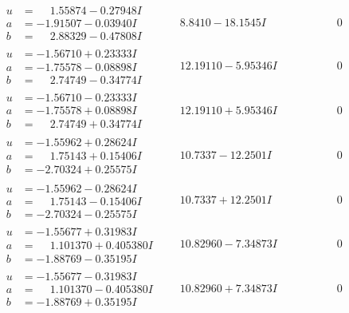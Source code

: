 \documentclass[1p]{elsarticle_modified}
\theoremstyle{definition}
\begin{document}
$$\begin{array}{c|c|c}
\begin{aligned}
u &= \phantom{-}1.55874 - 0.27948 I \\
a &= -1.91507 - 0.03940 I \\
b &= \phantom{-}2.88329 - 0.47808 I\end{aligned}
 & \phantom{-}8.8410 - 18.1545 I & \phantom{-0.000000 } 0 \\ \hline\begin{aligned}
u &= -1.56710 + 0.23333 I \\
a &= -1.75578 - 0.08898 I \\
b &= \phantom{-}2.74749 - 0.34774 I\end{aligned}
 & \phantom{-}12.19110 - 5.95346 I & \phantom{-0.000000 } 0 \\ \hline\begin{aligned}
u &= -1.56710 - 0.23333 I \\
a &= -1.75578 + 0.08898 I \\
b &= \phantom{-}2.74749 + 0.34774 I\end{aligned}
 & \phantom{-}12.19110 + 5.95346 I & \phantom{-0.000000 } 0 \\ \hline\begin{aligned}
u &= -1.55962 + 0.28624 I \\
a &= \phantom{-}1.75143 + 0.15406 I \\
b &= -2.70324 + 0.25575 I\end{aligned}
 & \phantom{-}10.7337 - 12.2501 I & \phantom{-0.000000 } 0 \\ \hline\begin{aligned}
u &= -1.55962 - 0.28624 I \\
a &= \phantom{-}1.75143 - 0.15406 I \\
b &= -2.70324 - 0.25575 I\end{aligned}
 & \phantom{-}10.7337 + 12.2501 I & \phantom{-0.000000 } 0 \\ \hline\begin{aligned}
u &= -1.55677 + 0.31983 I \\
a &= \phantom{-}1.101370 + 0.405380 I \\
b &= -1.88769 - 0.35195 I\end{aligned}
 & \phantom{-}10.82960 - 7.34873 I & \phantom{-0.000000 } 0 \\ \hline\begin{aligned}
u &= -1.55677 - 0.31983 I \\
a &= \phantom{-}1.101370 - 0.405380 I \\
b &= -1.88769 + 0.35195 I\end{aligned}
 & \phantom{-}10.82960 + 7.34873 I & \phantom{-0.000000 } 0 \\ \hline\begin{aligned}

\end{aligned}
\end{array}$$
\end{document}
